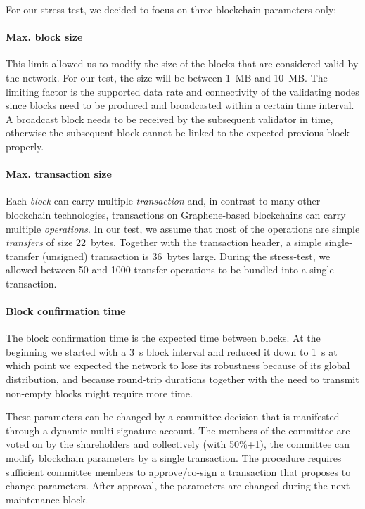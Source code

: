 For our stress-test, we decided to focus on three blockchain parameters only:

\paragraph{Max. block size}
This limit allowed us to modify the size of the blocks that are considered valid
by the network. For our test, the size will be between \SI{1}{MB} and
\SI{10}{MB}. The limiting factor is the supported data rate and connectivity of
the validating nodes since blocks need to be produced and broadcasted within a
certain time interval. A broadcast block needs to be received by the subsequent
validator in time, otherwise the subsequent block cannot be linked to the
expected previous block properly.

\paragraph{Max. transaction size}
Each \emph{block} can carry multiple \emph{transaction} and, in contrast to
many other blockchain technologies, transactions on Graphene-based blockchains
can carry multiple \emph{operations}. In our test, we assume that most of the
operations are simple \emph{transfers} of size \SI{22}{bytes}. Together with
the transaction header, a simple single-transfer (unsigned) transaction is
\SI{36}{bytes} large. During the stress-test, we allowed between \num{50} and
\num{1000} transfer operations to be bundled into a single transaction.

\paragraph{Block confirmation time}
The block confirmation time is the expected time between blocks. At the
beginning we started with a \SI{3}{s} block interval and reduced it down to
\SI{1}{s} at which point we expected the network to lose its robustness because of its global distribution, and because round-trip durations together with the need to transmit non-empty blocks might require more time.

\bigskip
These parameters can be changed by a committee decision that is manifested through a dynamic multi-signature account. The members of the committee are voted
on by the shareholders and collectively (with 50\%+1), the committee can
modify blockchain parameters by a single transaction. The procedure
requires sufficient committee members to approve/co-sign a transaction
that proposes to change parameters. After approval, the parameters are
changed during the next maintenance block.

